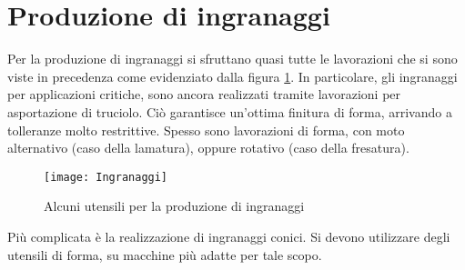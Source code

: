 \section{Produzione di ingranaggi}\label{sc:Ingranaggi}
Per la produzione di ingranaggi si sfruttano quasi tutte le lavorazioni che si sono viste in precedenza come evidenziato dalla figura \ref{fig:Ingranaggi}.
In particolare, gli ingranaggi per applicazioni critiche, sono ancora realizzati tramite lavorazioni per asportazione di truciolo. Ciò garantisce un'ottima finitura di forma, arrivando a tolleranze molto restrittive.
Spesso sono lavorazioni di forma, con moto alternativo (caso della lamatura), oppure rotativo (caso della fresatura).

\begin{figure}
\centering
\texttt{[image: Ingranaggi]}
\caption{Alcuni utensili per la produzione di ingranaggi}
\label{fig:Ingranaggi}
\end{figure}

Più complicata è la realizzazione di ingranaggi conici.
Si devono utilizzare degli utensili di forma, su macchine più adatte per 
tale scopo.